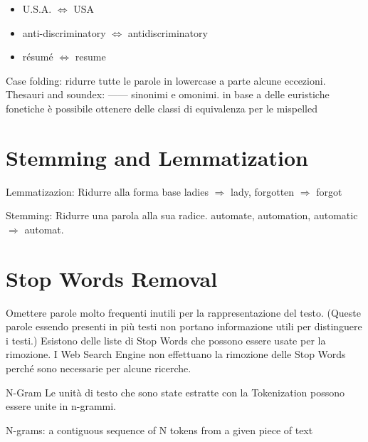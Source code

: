 \begin{itemize}
  \item U.S.A. $\Leftrightarrow$ USA
  \item anti-discriminatory $\Leftrightarrow$ antidiscriminatory
  \item résumé $\Leftrightarrow$ resume
\end{itemize}

Case folding: ridurre tutte le parole in lowercase a parte alcune eccezioni.
Thesauri and soundex: ------ sinonimi e omonimi. 
in base a delle euristiche fonetiche è possibile ottenere delle classi di equivalenza per le mispelled

\section{Stemming and Lemmatization}
Lemmatizazion: Ridurre alla forma base 
ladies $\Rightarrow$ lady, forgotten $\Rightarrow$ forgot

Stemming: Ridurre una parola alla sua radice.
automate, automation, automatic $\Rightarrow$ automat.

\section{Stop Words Removal}
Omettere parole molto frequenti inutili per la rappresentazione del testo.
(Queste parole essendo presenti in più testi non portano informazione utili per distinguere i testi.)
Esistono delle liste di Stop Words che possono essere usate per la rimozione.
I Web Search Engine non effettuano la rimozione delle Stop Words perché sono necessarie per alcune ricerche.


N-Gram
Le unità di testo che sono state estratte con la Tokenization possono essere unite in n-grammi. 

N-grams: a contiguous sequence of N tokens from a given piece of text
